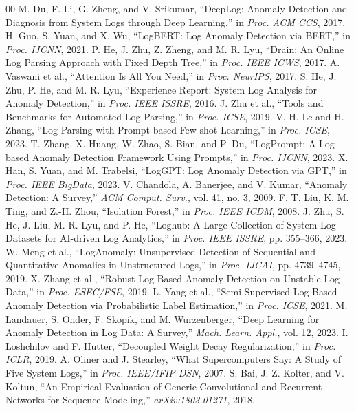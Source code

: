 \documentclass[conference]{IEEEtran}
\begin{document}
\begin{thebibliography}{00}
\scriptsize
\setlength{\itemsep}{-1pt}
\setlength{\parskip}{0pt}
 M. Du, F. Li, G. Zheng, and V. Srikumar, ``DeepLog: Anomaly Detection and Diagnosis from System Logs through Deep Learning,'' in \textit{Proc. ACM CCS}, 2017.
 H. Guo, S. Yuan, and X. Wu, ``LogBERT: Log Anomaly Detection via BERT,'' in \textit{Proc. IJCNN}, 2021.
 P. He, J. Zhu, Z. Zheng, and M. R. Lyu, ``Drain: An Online Log Parsing Approach with Fixed Depth Tree,'' in \textit{Proc. IEEE ICWS}, 2017.
 A. Vaswani et al., ``Attention Is All You Need,'' in \textit{Proc. NeurIPS}, 2017.
 S. He, J. Zhu, P. He, and M. R. Lyu, ``Experience Report: System Log Analysis for Anomaly Detection,'' in \textit{Proc. IEEE ISSRE}, 2016.
 J. Zhu et al., ``Tools and Benchmarks for Automated Log Parsing,'' in \textit{Proc. ICSE}, 2019.
 V. H. Le and H. Zhang, ``Log Parsing with Prompt-based Few-shot Learning,'' in \textit{Proc. ICSE}, 2023.
 T. Zhang, X. Huang, W. Zhao, S. Bian, and P. Du, ``LogPrompt: A Log-based Anomaly Detection Framework Using Prompts,'' in \textit{Proc. IJCNN}, 2023.
 X. Han, S. Yuan, and M. Trabelsi, ``LogGPT: Log Anomaly Detection via GPT,'' in \textit{Proc. IEEE BigData}, 2023.
 V. Chandola, A. Banerjee, and V. Kumar, ``Anomaly Detection: A Survey,'' \textit{ACM Comput. Surv.}, vol. 41, no. 3, 2009.
 F. T. Liu, K. M. Ting, and Z.-H. Zhou, ``Isolation Forest,'' in \textit{Proc. IEEE ICDM}, 2008.
 J. Zhu, S. He, J. Liu, M. R. Lyu, and P. He, ``Loghub: A Large Collection of System Log Datasets for AI-driven Log Analytics,'' in \textit{Proc. IEEE ISSRE}, pp. 355--366, 2023.
 W. Meng et al., ``LogAnomaly: Unsupervised Detection of Sequential and Quantitative Anomalies in Unstructured Logs,'' in \textit{Proc. IJCAI}, pp. 4739--4745, 2019.
 X. Zhang et al., ``Robust Log-Based Anomaly Detection on Unstable Log Data,'' in \textit{Proc. ESEC/FSE}, 2019.
 L. Yang et al., ``Semi-Supervised Log-Based Anomaly Detection via Probabilistic Label Estimation,'' in \textit{Proc. ICSE}, 2021.
 M. Landauer, S. Onder, F. Skopik, and M. Wurzenberger, ``Deep Learning for Anomaly Detection in Log Data: A Survey,'' \textit{Mach. Learn. Appl.}, vol. 12, 2023.
 I. Loshchilov and F. Hutter, ``Decoupled Weight Decay Regularization,'' in \textit{Proc. ICLR}, 2019.
 A. Oliner and J. Stearley, ``What Supercomputers Say: A Study of Five System Logs,'' in \textit{Proc. IEEE/IFIP DSN}, 2007.
 S. Bai, J. Z. Kolter, and V. Koltun, ``An Empirical Evaluation of Generic Convolutional and Recurrent Networks for Sequence Modeling,'' \textit{arXiv:1803.01271}, 2018.
\end{thebibliography}
\end{document}
